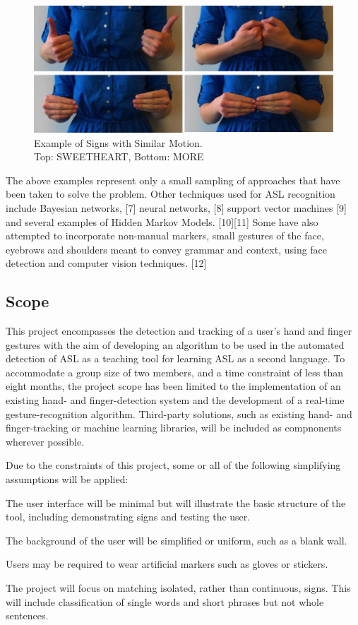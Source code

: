 \documentclass[12pt]{article}
\begin{document}
\begin{figure}[h!]
  \centering
  \includegraphics[scale=1]{MORESWEETHEART.png}
  \caption[Example of Signs with Similar Motion]
  { Example of Signs with Similar Motion.  \\ Top: SWEETHEART, Bottom: MORE  }
  \label{fig:MORE}
\end{figure}

The above examples represent only a small sampling of approaches that have been taken to solve the problem. Other techniques used for ASL recognition include Bayesian networks, [7] neural networks, [8] support vector machines [9] and several examples of Hidden Markov Models. [10][11] Some have also attempted to incorporate non-manual markers, small gestures of the face, eyebrows and shoulders meant to convey grammar and context, using face detection and computer vision techniques. [12]

\subsection{Scope}
This project encompasses the detection and tracking of a user's hand and finger gestures with the aim of developing an algorithm to be used in the automated detection of ASL as a teaching tool for learning ASL as a second language. To accommodate a group size of two members, and a time constraint of less than eight months, the project scope has been limited to the implementation of an existing hand- and finger-detection system and the development of a real-time gesture-recognition algorithm. Third-party solutions, such as existing hand- and finger-tracking or machine learning libraries, will be included as compnonents wherever possible. 

Due to the constraints of this project, some or all of the following simplifying assumptions will be applied:
\begin{enumerate*}
  \item The user interface will be minimal but will illustrate the basic structure of the tool, including demonstrating signs and testing the user. 
  \item The background of the user will be simplified or uniform, such as a blank wall. 
  \item Users may be required to wear artificial markers such as gloves or stickers.
  \item The project will focus on matching isolated, rather than continuous, signs. This will include classification of single words and short phrases but not whole sentences. 
\end{enumerate*}
\end{document}
